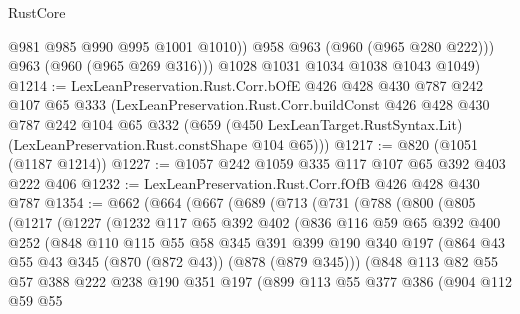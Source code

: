 \begin{lexlean}{RustCore}
\begin{coremodule}
              @981
              @985
              @990
              @995
              @1001
              @1010))
          @958
          @963
          (@960 (@965 @280 @222)))
        @963
        (@960 (@965 @269 @316)))
      @1028
      @1031
      @1034
      @1038
      @1043
      @1049)
@1214 := LexLeanPreservation.Rust.Corr.bOfE
    @426
    @428
    @430
    @787
    @242
    @107
    @65
    @333
    (LexLeanPreservation.Rust.Corr.buildConst
      @426
      @428
      @430
      @787
      @242
      @104
      @65
      @332
      (@659 (@450 LexLeanTarget.RustSyntax.Lit) (LexLeanPreservation.Rust.constShape @104 @65)))
@1217 := @820 (@1051 (@1187 @1214))
@1227 := @1057 @242 @1059 @335 @117 @107 @65 @392 @403 @222 @406
@1232 := LexLeanPreservation.Rust.Corr.fOfB @426 @428 @430 @787
@1354 := @662
    (@664
      (@667
        (@689
          (@713
            (@731
              (@788
                (@800
                  (@805
                    (@1217
                      (@1227
                        (@1232
                          @117
                          @65
                          @392
                          @402
                          (@836
                            @116
                            @59
                            @65
                            @392
                            @400
                            @252
                            (@848
                              @110
                              @115
                              @55
                              @58
                              @345
                              @391
                              @399
                              @190
                              @340
                              @197
                              (@864 @43 @55 @43 @345 (@870 (@872 @43)) (@878 (@879 @345)))
                              (@848
                                @113
                                @82
                                @55
                                @57
                                @388
                                @222
                                @238
                                @190
                                @351
                                @197
                                (@899
                                  @113
                                  @55
                                  @377
                                  @386
                                  (@904
                                    @112
                                    @59
                                    @55

\end{coremodule}
\end{lexlean}
